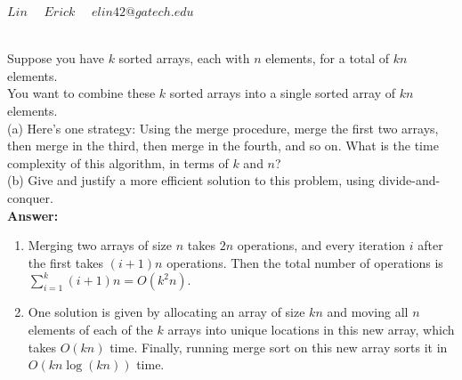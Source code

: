\documentclass{article}
\begin{document}
\title{
}



\date{}


\newcommand{\DEF}[1]{{\em #1\/}}

\newcommand\chic{\chi_c}
\newcommand\C{\hbox{${\cal C}$}}
\newcommand{\RR}{\mbox{$\mathbb R$}}
\newcommand{\NN}{\mbox{$\mathbb N$}}
\newcommand{\ZZ}{\mbox{$\mathbb Z$}}
\newcommand{\eopf}{\raisebox{0.8ex}{\framebox{}}}
\newcommand{\dist}{\hbox{\rm d}}
\renewcommand\a{\alpha}
\renewcommand\b{\beta}
\renewcommand\c{\gamma}
\renewcommand\d{\delta}
\newcommand\D{\Delta}
\newcommand{\directedchi}{\mbox{$\vec{\chi}$}}
\newcommand{\directedE}{\mbox{$\vec{E}$}}
\newcommand{\directedG}{\mbox{$\vec{G}$}}
\newcommand{\directedK}{\mbox{$\vec{K}$}}

\newenvironment{proof}%
{\noindent{\bf Proof.}\ }%
{\hfill\eopf\par\bigskip}%



 $Lin \quad$
 $Erick \quad$
          $elin42@gatech.edu$\\

\bigskip

\\
Suppose you have $k$ sorted arrays, each with $n$ elements, for a total of $kn$ elements.\\
You want to combine these $k$ sorted arrays into a single sorted array of $ kn$ elements.\\
(a) Here's one strategy: Using the merge procedure, merge the first two arrays,
then merge in the third, then merge in the fourth, and so on. What is the time
complexity of this algorithm, in terms of $k$ and $n$?\\
(b) Give and justify a more efficient solution to this problem, using divide-and-conquer.\\

\noindent
{\bf Answer:}
\begin{enumerate}[label=(\alph*)]
    \item
        Merging two arrays of size $n$ takes $2n$ operations, and every iteration $i$ after the first takes $(i + 1)n$ operations. Then the total number of operations is $\sum_{i = 1}^k (i + 1)n = O(k^2 n)$.
    \item
        One solution is given by allocating an array of size $kn$ and moving all $n$ elements of each of the $k$ arrays into unique locations in this new array, which takes $O(kn)$ time. Finally, running merge sort on this new array sorts it in $O(kn \log(kn))$ time.
\end{enumerate}
\end{document}
